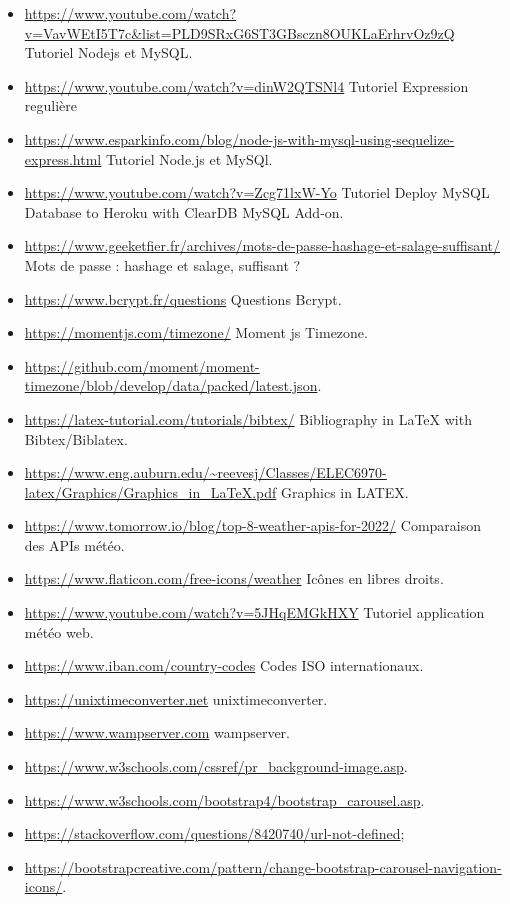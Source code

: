 \begin{itemize}
    \item \url{https://www.youtube.com/watch?v=VavWEtI5T7c&list=PLD9SRxG6ST3GBsczn8OUKLaErhrvOz9zQ} Tutoriel Nodejs et MySQL.
    \item \url{https://www.youtube.com/watch?v=dinW2QTSNl4} Tutoriel Expression regulière
    \item \url{https://www.esparkinfo.com/blog/node-js-with-mysql-using-sequelize-express.html} Tutoriel Node.js et MySQl.
    \item \url{https://www.youtube.com/watch?v=Zcg71lxW-Yo} Tutoriel Deploy MySQL Database to Heroku with ClearDB MySQL Add-on.
    \item \url{https://www.geeketfier.fr/archives/mots-de-passe-hashage-et-salage-suffisant/} Mots de passe : hashage et salage, suffisant ?
    \item \url{https://www.bcrypt.fr/questions} Questions Bcrypt.
    \item \url{https://momentjs.com/timezone/} Moment js Timezone.
    \item \url{https://github.com/moment/moment-timezone/blob/develop/data/packed/latest.json}.
    \item \url{https://latex-tutorial.com/tutorials/bibtex/} Bibliography in LaTeX with Bibtex/Biblatex.
    \item \url{https://www.eng.auburn.edu/~reevesj/Classes/ELEC6970-latex/Graphics/Graphics_in_LaTeX.pdf} Graphics in LATEX.
    \item \url{https://www.tomorrow.io/blog/top-8-weather-apis-for-2022/} Comparaison des APIs météo.
    \item \url{https://www.flaticon.com/free-icons/weather} Icônes en libres droits.
    \item \url{https://www.youtube.com/watch?v=5JHqEMGkHXY} Tutoriel application météo web.
    \item \url{https://www.iban.com/country-codes} Codes ISO internationaux.
    \item \url{https://unixtimeconverter.net} unixtimeconverter.
    \item \url{https://www.wampserver.com} wampserver.
    \item \url{https://www.w3schools.com/cssref/pr_background-image.asp}.
    \item \url{https://www.w3schools.com/bootstrap4/bootstrap_carousel.asp}.
    \item \url{https://stackoverflow.com/questions/8420740/url-not-defined};
    \item \url{https://bootstrapcreative.com/pattern/change-bootstrap-carousel-navigation-icons/}.

\end{itemize}
